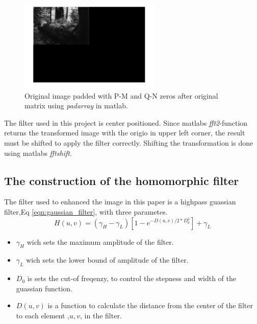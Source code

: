 \begin{figure}[h!]
  \begin{center}
    \includegraphics[width=0.6\textwidth]{pics/zeroPadded.png}
  \end{center}
  \caption{Original image padded with P-M and Q-N zeros after original matrix using \textit{padarray} in matlab.}
  \label{fig:zeropadded}    
\end{figure}

The filter used in this project is center positioned. Since matlabs \textit{fft2}-function returns the transformed image with the origio in upper left corner, the result must be shifted to apply the filter correctly. Shifting the transformation is done using matlabs \textit{fftshift}.

\subsection{The construction of the homomorphic filter}
The filter used to enhanced the image in this paper is a highpass guassian filter,Eq \ref{eqn:gaussian_filter}, with three parametes. 
    \begin{equation}
    \label{eqn:gaussian_filter}
      H(u,v) = \left( \gamma_H - \gamma_L \right) \left[ 1 - e^{- D(u,v) /2 * D_0^2}\right] + \gamma_L 
    \end{equation}

\begin{itemize}
  \item $\gamma_H$ wich sets the maximum amplitude of the filter.\\
  \item $\gamma_L$ wich sets the lower bound of amplitude of the filter.\\
  \item $D_0$ is sets the cut-of freqenzy, to control the stepness and width of the guassian function.
  \item $D(u,v)$ is a function to calculate the distance from the center of the filter to each element ,$u,v$, in the filter. 
\end{itemize}

